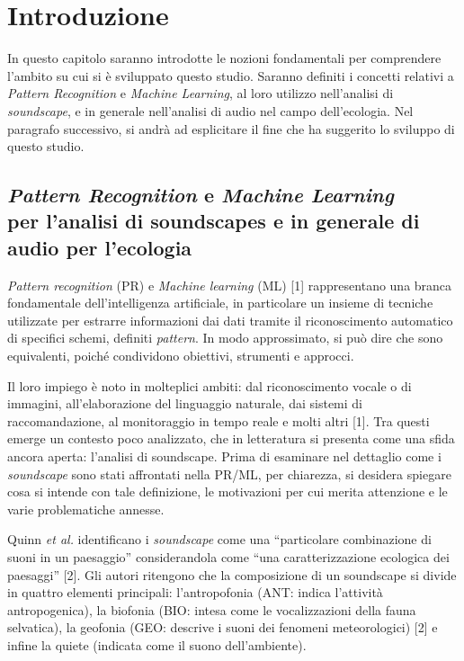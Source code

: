 \chapter{Introduzione}
In questo capitolo saranno introdotte le nozioni fondamentali per comprendere l’ambito su
cui si è sviluppato questo studio. Saranno definiti i concetti relativi a \textit{Pattern Recognition} e
\textit{Machine Learning}, al loro utilizzo nell’analisi di \textit{soundscape}, e in generale nell’analisi di
audio nel campo dell’ecologia. Nel paragrafo successivo, si andrà ad esplicitare il fine che ha
suggerito lo sviluppo di questo studio.

\section{\textit{Pattern Recognition} e \textit{Machine Learning} \\ per l'analisi di soundscapes e in generale di audio per l'ecologia}
\textit{Pattern recognition} (PR) e \textit{Machine learning} (ML) [1] rappresentano una branca
fondamentale dell’intelligenza artificiale, in particolare un insieme di tecniche utilizzate per
estrarre informazioni dai dati tramite il riconoscimento automatico di specifici schemi,
definiti \textit{pattern}. In modo approssimato, si può dire che sono equivalenti, poiché condividono
obiettivi, strumenti e approcci.

Il loro impiego è noto in molteplici ambiti: dal riconoscimento vocale o di immagini,
all’elaborazione del linguaggio naturale, dai sistemi di raccomandazione, al monitoraggio in
tempo reale e molti altri [1]. Tra questi emerge un contesto poco analizzato, che in letteratura
si presenta come una sfida ancora aperta: l’analisi di soundscape. Prima di esaminare nel
dettaglio come i \textit{soundscape} sono stati affrontati nella PR/ML, per chiarezza, si desidera
spiegare cosa si intende con tale definizione, le motivazioni per cui merita attenzione e le
varie problematiche annesse.

Quinn \textit{et al.} identificano i \textit{soundscape} come una “particolare combinazione di suoni in un
paesaggio” considerandola come “una caratterizzazione ecologica dei paesaggi” [2]. Gli
autori ritengono che la composizione di un soundscape si divide in quattro elementi
principali: l’antropofonia (ANT: indica l’attività antropogenica), la biofonia (BIO: intesa
come le vocalizzazioni della fauna selvatica), la geofonia (GEO: descrive i suoni dei
fenomeni meteorologici) [2] e infine la quiete (indicata come il suono dell’ambiente).

